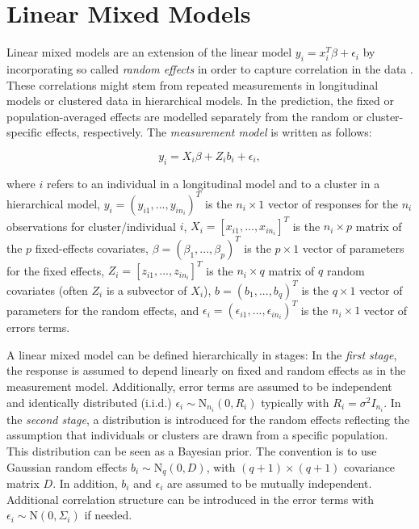\documentclass[12pt]{article}
\begin{document}
\section{Linear Mixed Models}\label{lmm}

Linear mixed models are an extension of the linear model $y_i = x^T_i\beta + \epsilon_i$ by incorporating so called \textit{random effects} in order to capture correlation in the data \cite{fahrmeir2013regression}. These correlations might stem from repeated measurements in longitudinal models or clustered data in hierarchical models. In the prediction, the fixed or population-averaged effects are modelled separately from the random or cluster-specific effects, respectively. The \textit{measurement model} is written as follows:

$$y_i = X_i \beta + Z_i b_i + \epsilon_i,$$

where $i$ refers to an individual in a longitudinal model and to a cluster in a
hierarchical model, $y_i = ( y_{i1},...,y_{in_i} )^T$ is the $n_i \times 1$ vector of responses for the $n_i$ observations for cluster/individual $i$, $X_i = \left[ x_{i1},..., x_{in_i}\right]^T$ is the $n_i \times p$ matrix of the $p$ fixed-effects covariates, $\beta = (\beta_1,...,\beta_p)^T$ is the $p\times1$ vector of parameters for the fixed effects, $Z_i = \left[z_{i1},...,z_{in_i}\right]^T$ is the $n_i\times q$ matrix of $q$ random covariates (often $Z_i$ is a subvector of $X_i$), $b = (b_1,...,b_q)^T$ is the $q\times1$ vector of parameters for the random effects, and $\epsilon_i = (\epsilon_{i1},...,\epsilon_{in_i})^T$ is the $n_i\times1$ vector of errors terms.

A linear mixed model can be defined hierarchically in stages: 
In the \textit{first stage}, the response is assumed to depend linearly on fixed and random effects as in the measurement model. Additionally, error terms are assumed to be independent and identically distributed (i.i.d.) $\epsilon_i \sim \mathrm{N}_{n_i}(0,R_i)$ typically with $R_i=\sigma^2 I_{n_i}$. 
In the \textit{second stage}, a distribution is introduced for the random effects reflecting the assumption that individuals or clusters are drawn from a specific population.
This distribution can be seen as a Bayesian prior. The convention is to use Gaussian random effects $b_i \sim \mathrm{N}_q(0,D)$, with $(q{+}1)\times (q{+}1)$ covariance matrix $D$. In addition, $b_i$ and $\epsilon_i$ are assumed to be mutually independent. 
Additional correlation structure can be introduced in the error terms with $\epsilon_i \sim \mathrm{N}(0, \Sigma_i)$ if needed.
\end{document}
